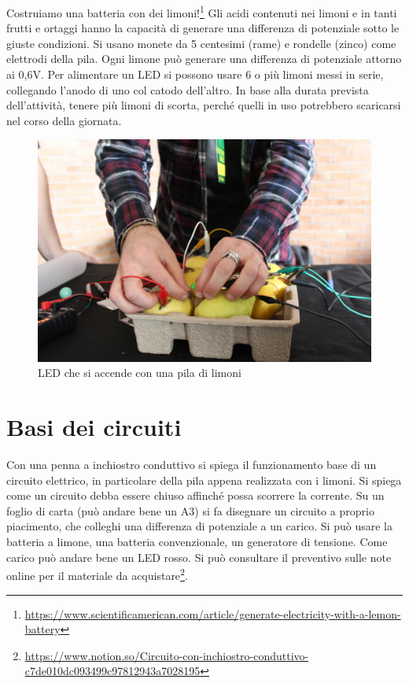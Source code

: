 \documentclass[a4paper]{article}
\begin{document}
Costruiamo una batteria con dei limoni!\footnote{
  \url{https://www.scientificamerican.com/article/generate-electricity-with-a-lemon-battery}
} Gli acidi contenuti nei limoni e in tanti frutti e ortaggi hanno la capacità
di generare una differenza di potenziale sotto le giuste condizioni. Si usano
monete da 5 centesimi (rame) e rondelle (zinco) come elettrodi della pila. Ogni
limone può generare una differenza di potenziale attorno ai 0,6V. Per alimentare
un LED si possono usare 6 o più limoni messi in serie, collegando l'anodo di uno
col catodo dell'altro. In base alla durata prevista dell'attività, tenere più
limoni di scorta, perché quelli in uso potrebbero scaricarsi nel corso della
giornata.

\begin{figure}[ht]
  \centering
  \includegraphics[width=\linewidth]{figures/limoni}
  \caption{\label{fig:limoni} LED che si accende con una pila di limoni}
\end{figure}

\section{Basi dei circuiti}%
\label{sec:inchiostro}

Con una penna a inchiostro conduttivo si spiega il funzionamento base di un
circuito elettrico, in particolare della pila appena realizzata con i limoni. Si
spiega come un circuito debba essere chiuso affinché possa scorrere la corrente.
Su un foglio di carta (può andare bene un A3) si fa disegnare un circuito a
proprio piacimento, che colleghi una differenza di potenziale a un carico. Si
può usare la batteria a limone, una batteria convenzionale, un generatore di
tensione. Come carico può andare bene un LED rosso. Si può consultare il
preventivo sulle note online per il materiale da acquistare\footnote{
  \url{https://www.notion.so/Circuito-con-inchiostro-conduttivo-c7de010dc093499c97812943a7028195}
}.
\end{document}
